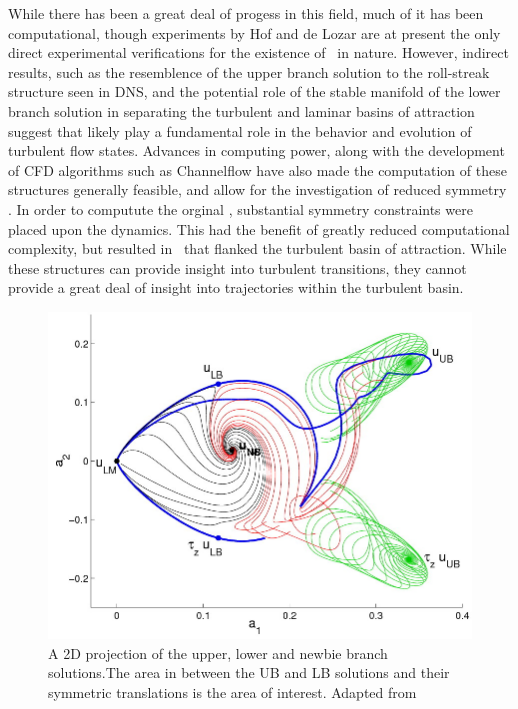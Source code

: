 While there has been a great deal of progess in this field, much of it has been computational, though experiments by Hof and de Lozar are at present the only direct experimental verifications for the existence of \ecs~in nature. However, indirect results, such as the resemblence of the upper branch solution to the roll-streak structure seen in DNS, and the potential role of the stable manifold of the lower branch solution in separating the turbulent and laminar basins of attraction suggest that \ecs likely play a fundamental role in the behavior and evolution of turbulent flow states. Advances in computing power, along with the development of CFD algorithms such as Channelflow have also made the computation of these structures generally feasible, and allow for the investigation of reduced symmetry \ecs. In order to computute the orginal \ecs, substantial symmetry constraints were placed upon the dynamics. This had the benefit of greatly reduced computational complexity, but resulted in \ecs~that flanked the turbulent basin of attraction. While these structures can provide insight into turbulent transitions, they cannot provide a great deal of insight into trajectories within the turbulent basin. 
\begin{figure}
\centerline{
\includegraphics[scale=0.4]{Figs/stateSpace}}
\caption{A 2D projection of the upper, lower and newbie branch solutions.The area in between the UB and LB solutions and their symmetric translations is the area of interest.  Adapted from}\label{fig:UBLBStateSpace}
\end{figure}